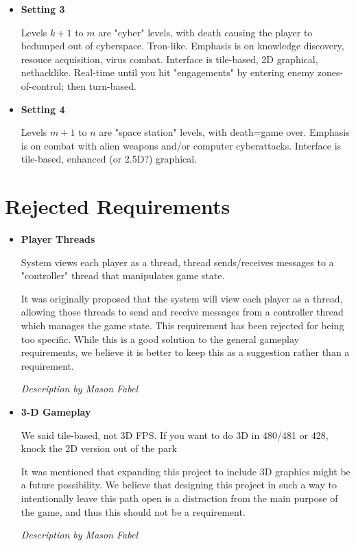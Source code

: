 \documentclass[12pt]{article}
\begin{document}
\begin{itemize}
	\item \textbf{Setting 3}
	
	Levels $k+1$ to $m$ are "cyber" levels, with death causing the player to bedumped out of cyberspace.
	Tron-like. Emphasis is on knowledge discovery, resouce acquisition,
	virus combat. Interface is tile-based, 2D graphical, nethacklike.
	Real-time until you hit "engagements" by entering enemy
	zones-of-control; then turn-based.
	
	\item \textbf{Setting 4}
	
	Levels $m+1$ to $n$ are "space station" levels, with death=game over.
	Emphasis is on combat with alien weapons and/or computer cyberattacks.
	Interface is tile-based, enhanced (or 2.5D?) graphical. 
\end{itemize}

\section{Rejected Requirements}
\begin{itemize}
	\item \textbf{Player Threads}
	
	System views each player as a thread, thread sends/receives messages
	to a "controller" thread that manipulates game state.
	
	It was originally proposed that the system will view each player as a
	thread, allowing those threads to send and receive messages from a
	controller thread which manages the game state. This requirement has been
	rejected for being too specific. While this is a good solution to the
	general gameplay requirements, we believe it is better to keep this as a
	suggestion rather than a requirement.
	
	\emph{Description by Mason Fabel}
		
	\item \textbf{3-D Gameplay}
	
	We said tile-based, not 3D FPS. If you want to do 3D in 480/481 or
	428, knock the 2D version out of the park 
	
	It was mentioned that expanding this project to include 3D graphics might
	be a future possibility. We believe that designing this project in such a
	way to intentionally leave this path open is a distraction from the main
	purpose of the game, and thus this should not be a requirement.
	
	\emph{Description by Mason Fabel}
	
\end{itemize}
\end{document}
